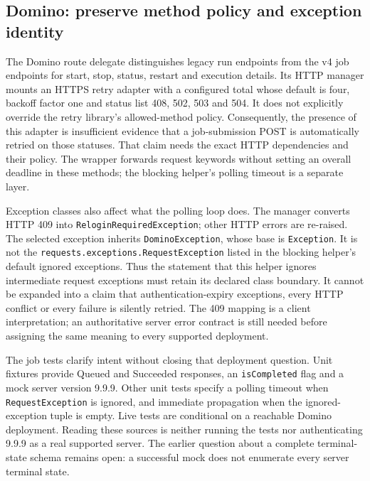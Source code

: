 \subsection{Domino: preserve method policy and exception identity}

The Domino route delegate distinguishes legacy run endpoints from the v4
job endpoints for start, stop, status, restart and execution details. Its
HTTP manager mounts an HTTPS retry adapter with a configured total whose
default is four, backoff factor one and status list 408, 502, 503 and 504.
It does not explicitly override the retry library's allowed-method policy.
Consequently, the presence of this adapter is insufficient evidence that a
job-submission POST is automatically retried on those statuses. That claim
needs the exact HTTP dependencies and their policy. The wrapper forwards
request keywords without setting an overall deadline in these methods;
the blocking helper's polling timeout is a separate layer.
\citep{exec23_workflow_delegates_dominopy}

Exception classes also affect what the polling loop does. The manager
converts HTTP 409 into \texttt{ReloginRequiredException}; other HTTP errors
are re-raised. The selected exception inherits \texttt{DominoException},
whose base is \texttt{Exception}. It is not the
\texttt{requests.exceptions.RequestException} listed in the blocking
helper's default ignored exceptions. Thus the statement that this helper
ignores intermediate request exceptions must retain its declared class
boundary. It cannot be expanded into a claim that authentication-expiry
exceptions, every HTTP conflict or every failure is silently retried. The
409 mapping is a client interpretation; an authoritative server error
contract is still needed before assigning the same meaning to every
supported deployment.
\citep{exec23_workflow_delegates_dominopy,exec23_workflow_dominopy}

The job tests clarify intent without closing that deployment question.
Unit fixtures provide Queued and Succeeded responses, an
\texttt{isCompleted} flag and a mock server version 9.9.9. Other unit tests
specify a polling timeout when \texttt{RequestException} is ignored, and
immediate propagation when the ignored-exception tuple is empty. Live tests
are conditional on a reachable Domino deployment. Reading these sources is
neither running the tests nor authenticating 9.9.9 as a real supported
server. The earlier question about a complete terminal-state schema remains
open: a successful mock does not enumerate every server terminal state.
\citep{exec23_workflow_delegates_dominopy}

